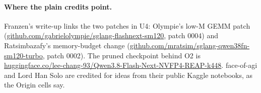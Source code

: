 \paragraph{Where the plain credits point.} Franzen's write-up \citep{franzen2026writeup} links the two patches in U4: Olympie's low-M GEMM patch (\url{github.com/gabrielolympie/sglang-flashnext-sm120}, patch 0004) and Ratsimbazafy's memory-budget change (\url{github.com/mratsim/sglang-qwen38fn-sm120-turbo}, patch 0002). The pruned checkpoint behind O2 is \url{huggingface.co/lee-chang-93/Qwen3.8-Flash-Next-NVFP4-REAP-k448}. face-of-agi and Lord Han Solo are credited for ideas from their public Kaggle notebooks, as the Origin cells say. %

